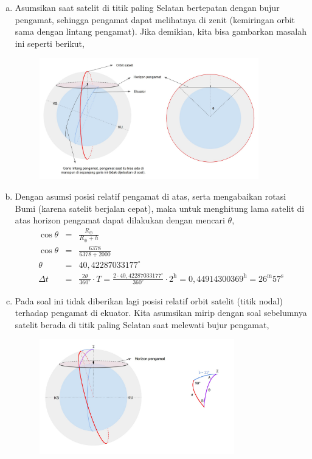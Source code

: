 \documentclass[11pt,fleqn]{exam}
\begin{document}
\begin{questions}
\begin{enumerate}[a.]
    \item Asumsikan saat satelit di titik paling Selatan bertepatan dengan bujur pengamat, sehingga pengamat dapat melihatnya di zenit (kemiringan orbit sama dengan lintang pengamat). Jika demikian, kita bisa gambarkan masalah ini seperti berikut,
    \begin{figure}[!ht]
        \centering
        \includegraphics[width=0.9\textwidth]{osn2023_2_kasus1.jpg}
    \end{figure}

    \item Dengan asumsi posisi relatif pengamat di atas, serta mengabaikan rotasi Bumi (karena satelit berjalan cepat), maka untuk menghitung lama satelit di atas horizon pengamat dapat dilakukan dengan mencari $\theta$,
    \begin{eqnarray*}
        \cos{\theta} &=& \frac{R_{\oplus}}{R_\oplus + h}\\
        \cos{\theta} &=& \frac{6378}{6378 + 2000}\\
        \theta &=& 40,42287033177^{\circ}\\
        \Delta t &=& \frac{2 \theta}{360^{\circ}} \cdot T = \frac{2 \cdot 40,42287033177^{\circ}}{360^{\circ}} \cdot 2^\text{h}  = 0,44914300369^{\text{h}} = 26^{\text{m}} 57^{\text{s}}  
    \end{eqnarray*}

    \item Pada soal ini tidak diberikan lagi posisi relatif orbit satelit (titik nodal) terhadap pengamat di ekuator. Kita asumsikan mirip dengan soal sebelumnya satelit berada di titik paling Selatan saat melewati bujur pengamat,
    \begin{figure}
        \centering
        \includegraphics[width=0.8\textwidth]{osn2023_2_kasus2.jpg}
    \end{figure}


\end{enumerate}
\end{questions}
\end{document}
